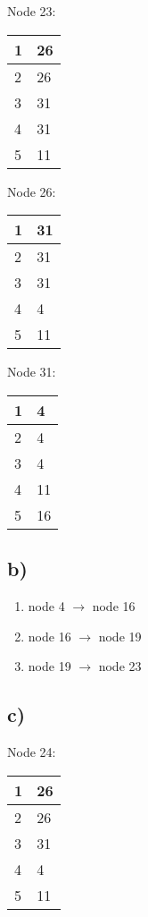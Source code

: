 \documentclass{scrartcl}
\begin{document}
	\begin{minipage}[t]{.25\linewidth}
		\centering
        Node 23:\\
		\begin{tabular}{|l|l|}
			\hline
			1 & 26 \\ \hline
			2 & 26 \\ \hline
			3 & 31 \\ \hline
			4 & 31 \\ \hline
			5 & 11 \\ \hline
		\end{tabular}
	\end{minipage}%
	\begin{minipage}[t]{.25\linewidth}
		\centering
        Node 26:\\
		\begin{tabular}{|l|l|}
			\hline
			1 & 31 \\ \hline
			2 & 31 \\ \hline
			3 & 31 \\ \hline
			4 & 4 \\ \hline
			5 & 11 \\ \hline
		\end{tabular}
	\end{minipage}
	\begin{minipage}[t]{.25\linewidth}
		\centering
        Node 31:\\
		\begin{tabular}{|l|l|}
			\hline
			1 & 4 \\ \hline
			2 & 4 \\ \hline
			3 & 4 \\ \hline
			4 & 11 \\ \hline
			5 & 16 \\ \hline
		\end{tabular}
	\end{minipage}


\subsection*{b)}
\begin{enumerate}
	\item node 4 $ \rightarrow $ node 16
	\item node 16 $ \rightarrow $ node 19
	\item node 19 $ \rightarrow $ node 23
\end{enumerate}

\subsection*{c)}
\begin{minipage}[t]{.25\linewidth}
	\centering
    Node 24:\\
	\begin{tabular}{|l|l|}
		\hline
		1 & 26 \\ \hline
		2 & 26 \\ \hline
		3 & 31 \\ \hline
		4 & 4 \\ \hline
		5 & 11 \\ \hline
	\end{tabular}
\end{minipage}
\end{document}
